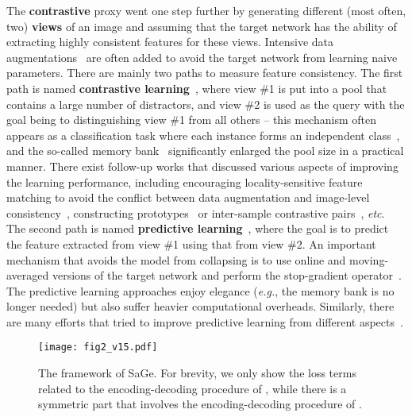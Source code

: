 \documentclass[10pt,twocolumn,letterpaper]{article}
\begin{document}
The \textbf{contrastive} proxy went one step further by generating different (most often, two) \textbf{views} of an image and assuming that the target network has the ability of extracting highly consistent features for these views. Intensive data augmentations~\cite{bachman2019learning,misra2020self} are often added to avoid the target network from learning naive parameters. There are mainly two paths to measure feature consistency. The first path is named \textbf{contrastive learning}~\cite{he2020momentum,wu2018unsupervised,zhuang2019local,oord2018representation,bachman2019learning,chen2020simple}, where view \#1 is put into a pool that contains a large number of distractors, and view \#2 is used as the query with the goal being to distinguishing view \#1 from all others -- this mechanism often appears as a classification task where each instance forms an independent class~\cite{dosovitskiy2015discriminative}, and the so-called memory bank~\cite{wu2018unsupervised,he2020momentum} significantly enlarged the pool size in a practical manner. There exist follow-up works that discussed various aspects of improving the learning performance, including encouraging locality-sensitive feature matching to avoid the conflict between data augmentation and image-level consistency~\cite{wang2021dense,li2021efficient,xie2021detco}, constructing prototypes~\cite{li2020prototypical,caron2020unsupervised} or inter-sample contrastive pairs~\cite{chen2020simple}, \textit{etc}. The second path is named \textbf{predictive learning}~\cite{grill2020bootstrap}, where the goal is to predict the feature extracted from view \#1 using that from view \#2. An important mechanism that avoids the model from collapsing is to use online and moving-averaged versions of the target network and perform the stop-gradient operator~\cite{grill2020bootstrap,chen2021exploring}. The predictive learning approaches enjoy elegance (\textit{e.g.}, the memory bank is no longer needed) but also suffer heavier computational overheads. Similarly, there are many efforts that tried to improve predictive learning from different aspects~\cite{tejankar2021isd,koohpayegani2021mean,zbontar2021barlow}.

\begin{figure*}\begin{center}
\texttt{[image: fig2\_v15.pdf]}
\end{center}
\caption{The framework of SaGe. For brevity, we only show the loss terms related to the encoding-decoding procedure of , while there is a symmetric part that involves the encoding-decoding procedure of .}
\label{fig:framework}
\end{figure*}
\end{document}
